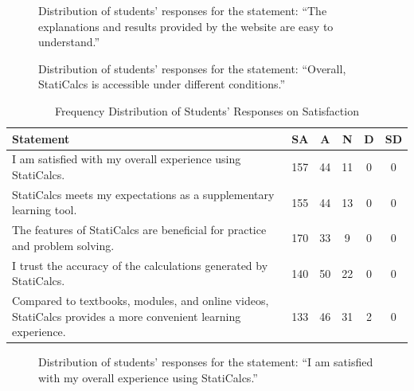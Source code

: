 \begin{figure}[H]
\centering
{}
\caption{Distribution of students' responses for the statement: ``The explanations and results provided by the website are easy to understand.''}
\end{figure}


\begin{figure}[H]
\centering
{}
\caption{Distribution of students' responses for the statement: ``Overall, StatiCalcs is accessible under different conditions.''}
\end{figure}

\begin{table}[H]
\centering
\caption{Frequency Distribution of Students’ Responses on Satisfaction}
\renewcommand{\arraystretch}{1.3}
\begin{tabular}{p{8cm}ccccc}
\hline
\textbf{Statement} & \textbf{SA} & \textbf{A} & \textbf{N} & \textbf{D} & \textbf{SD}\\
\hline
I am satisfied with my overall experience using StatiCalcs. & 157 & 44 & 11 & 0 & 0\\
StatiCalcs meets my expectations as a supplementary learning tool. & 155 & 44 & 13 & 0 & 0\\
The features of StatiCalcs are beneficial for practice and problem solving. & 170 & 33 & 9 & 0 & 0\\
I trust the accuracy of the calculations generated by StatiCalcs. & 140 & 50 & 22 & 0 & 0\\
Compared to textbooks, modules, and online videos, StatiCalcs provides a more convenient learning experience. & 133 & 46 & 31 & 2 & 0\\
\hline
\end{tabular}
\end{table}


\begin{figure}[H]
\centering
{}
\caption{Distribution of students' responses for the statement: ``I am satisfied with my overall experience using StatiCalcs.''}
\end{figure}


